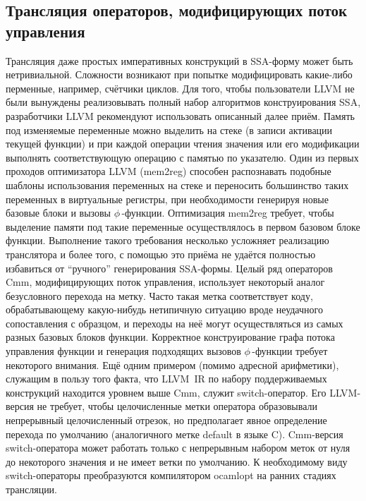 \documentclass[a4paper, 12pt]{article}
\begin{document}
\subsection{Трансляция операторов, модифицирующих поток управления}
Трансляция даже простых императивных конструкций в SSA-форму может быть нетривиальной. Сложности возникают при попытке
модифицировать какие-либо перменные, например, счётчики циклов. Для того, чтобы пользователи LLVM не были вынуждены
реализовывать полный набор алгоритмов конструирования SSA, разработчики LLVM рекомендуют использовать описанный далее
приём. Память под изменяемые переменные можно выделить на стеке (в записи активации текущей функции) и при каждой
операции чтения значения или его модификации выполнять соответствующую операцию с памятью по указателю. Один из
первых проходов оптимизатора LLVM (mem2reg) способен распознавать подобные шаблоны использования переменных на стеке и
переносить большинство таких переменных в виртуальные регистры, при необходимости генерируя новые базовые блоки и
вызовы $\phi\,$-функции. Оптимизация mem2reg требует, чтобы выделение памяти под такие переменные осуществлялось в
первом базовом блоке функции. Выполнение такого требования несколько усложняет реализацию транслятора и более того, с
помощью это приёма не удаётся полностью избавиться от ``ручного'' генерирования SSA-формы. Целый ряд операторов Cmm,
модифицирующих поток управления, использует некоторый аналог безусловного перехода на метку. Часто такая метка
соответствует коду, обрабатывающему какую-нибудь нетипичную ситуацию вроде неудачного сопоставления с образцом, и
переходы на неё могут осуществляться из самых разных базовых блоков функции. Корректное конструирование графа потока
управления функции и генерация подходящих вызовов $\phi\,$-функции требует некоторого внимания. Ещё одним
примером (помимо адресной арифметики), служащим в пользу того факта, что LLVM~IR по набору поддерживаемых конструкций
находится уровнем выше Cmm, служит switch-оператор. Его LLVM-версия не требует, чтобы целочисленные метки оператора
образовывали непрерывный целочисленный отрезок, но предполагает явное определение перехода по умолчанию (аналогичного
метке default в языке C). Cmm-версия switch-оператора может работать только с непрерывным набором меток от нуля до
некоторого значения и не имеет ветки по умолчанию. К необходимому виду switch-операторы преобразуются компилятором
ocamlopt на ранних стадиях трансляции.
\end{document}
